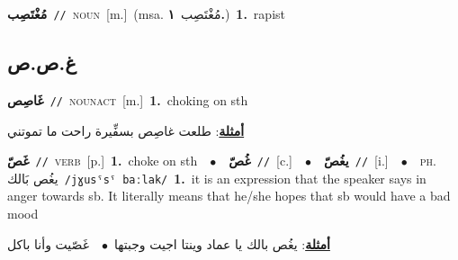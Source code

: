 \documentclass[10pt,a4paper,twoside]{article} %
\begin{document}
\begin{multicols}{2}
{\setlength\topsep{0pt}\textbf{\foreignlanguage{arabic}{مُغْتَصِب}}\ {\color{gray}\texttt{//}\color{black}}\ \textsc{noun}\ [m.]\ \color{gray}(msa. \foreignlanguage{arabic}{مُغْتَصِب}~\foreignlanguage{arabic}{\textbf{١.}})\color{black}\ \textbf{1.}~rapist\ } \vspace{2mm}

\vspace{-3mm}
\subsection*{\color{blue}\foreignlanguage{arabic}{غ.ص.ص}\color{blue}{}} 

{\setlength\topsep{0pt}\textbf{\foreignlanguage{arabic}{غَاصِص}}\ {\color{gray}\texttt{//}\color{black}}\ \textsc{noun\textunderscore act}\ [m.]\ \textbf{1.}~choking on sth\  \begin{flushright}\color{gray}\foreignlanguage{arabic}{\textbf{\underline{\foreignlanguage{arabic}{أمثلة}}}: طلعت غاصِص بسفِّيرة راحت ما تموتني}\end{flushright}\color{black}} \vspace{2mm}

{\setlength\topsep{0pt}\textbf{\foreignlanguage{arabic}{غَصّ}}\ {\color{gray}\texttt{//}\color{black}}\ \textsc{verb}\ [p.]\ \textbf{1.}~choke on sth\ \ $\bullet$\ \ \setlength\topsep{0pt}\textbf{\foreignlanguage{arabic}{غُصّ}}\ {\color{gray}\texttt{//}\color{black}}\ [c.]\ \ $\bullet$\ \ \setlength\topsep{0pt}\textbf{\foreignlanguage{arabic}{يغُصّ}}\ {\color{gray}\texttt{//}\color{black}}\ [i.]\ \ $\bullet$\ \ \textsc{ph.} \color{gray} \foreignlanguage{arabic}{يغُص بَالك}\color{black}\ {\color{gray}\texttt{/{\sffamily jɣusˤsˤ baːlak}/}\color{black}}\ \textbf{1.}~it is an expression that the speaker says in anger towards sb. It literally means that he/she hopes that sb would have a bad mood\  \begin{flushright}\color{gray}\foreignlanguage{arabic}{\textbf{\underline{\foreignlanguage{arabic}{أمثلة}}}: يغُص بالك يا عماد وينتا اجيت وجبتها\ $\bullet$\ \  غَصّيت وأنا باكل}\end{flushright}\color{black}} \vspace{2mm}


\end{multicols}
\end{document}
